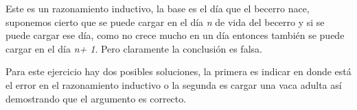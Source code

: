 \documentclass[spanish,12pt,letterpaper]{article}
\begin{document}
Este es un razonamiento inductivo, la base es el día que el becerro nace,
suponemos cierto que se puede cargar en el día \textit{n} de vida del becerro y
si se puede cargar ese día, como no crece mucho en un día entonces también se
puede cargar en el día \textit{n+ 1}.  Pero claramente la conclusión es falsa.

Para este ejercicio hay dos posibles soluciones,  la primera es indicar en donde
está el error en el razonamiento inductivo o la segunda es cargar una vaca adulta
así demostrando que el argumento es correcto.
\end{document}
